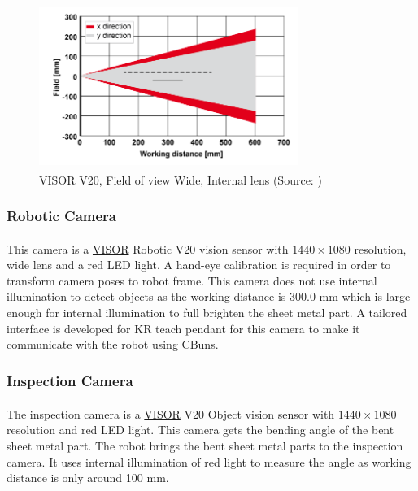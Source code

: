 \begin{figure}[h]
    \centering
    \includegraphics[width=0.75\textwidth]{figures/visor-v20-fov.png}
    \caption{\hyperref[acro:VISOR]{VISOR}\textsuperscript{\textregistered} V20, Field of view Wide, Internal lens (Source: \cite[page 357]{visor_user_manual})}
    \label{fig:visor-v20}
\end{figure}


\subsubsection{Robotic Camera}
\label{subsubsec:robotic-camera}
This camera is a \hyperref[acro:VISOR]{VISOR}\textsuperscript{\textregistered} Robotic V20 vision sensor with $1440 \times 1080$ resolution, wide lens and a red LED light.
\cite{visor-robotic}
A hand-eye calibration is required in order to transform camera poses to robot frame. This camera does not use internal illumination to detect
objects as the working distance is 300.0 mm which is large enough for internal illumination to full brighten the sheet metal part.
A tailored interface is developed for KR teach pendant for this camera to make it communicate with the robot using CBuns.

\subsubsection{Inspection Camera}
\label{subsubsec:inspection-camera}
The inspection camera is a \hyperref[acro:VISOR]{VISOR}\textsuperscript{\textregistered} V20 Object vision sensor with $1440 \times 1080$ resolution and red LED light.
\cite{visor-object}
This camera gets the bending angle
of the bent sheet metal part. The robot brings the bent sheet metal parts to the inspection camera. 
It uses internal illumination of red light to measure the angle as working distance is only around 100 mm. 